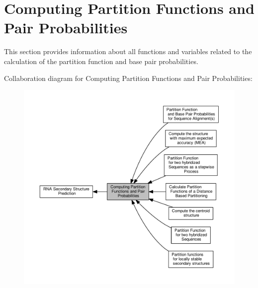 \hypertarget{group__pf__fold}{}\section{Computing Partition Functions and Pair Probabilities}
\label{group__pf__fold}


This section provides information about all functions and variables related to the calculation of the partition function and base pair probabilities.  


Collaboration diagram for Computing Partition Functions and Pair Probabilities\+:
\nopagebreak
\begin{figure}[H]
\begin{center}
\leavevmode
\includegraphics[width=350pt]{group__pf__fold}
\end{center}
\end{figure}
